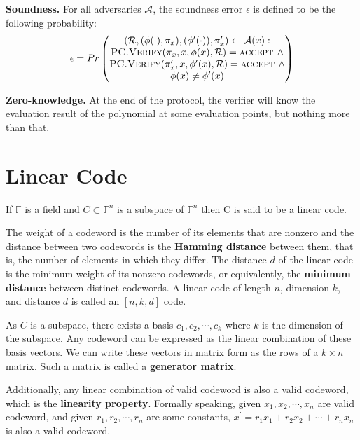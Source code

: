 \textbf{Soundness.} For all adversaries $\mathcal{A}$, the soundness error $\epsilon$ is defined to be the following probability:
$$
\epsilon = Pr
\begin{pmatrix}
 (\mathcal{R}, (\phi(\cdot), \pi_x), (\phi^\prime(\cdot)), \pi_x^\prime) \leftarrow \mathcal{A}(x): \\
 \textsc{PC.Verify}(\pi_x, x, \phi(x), \mathcal{R}) = \textsc{accept } \wedge \\
 \textsc{PC.Verify}(\pi_x^\prime, x, \phi^\prime(x), \mathcal{R}) = \textsc{accept } \wedge \\
 \phi(x) \neq \phi^\prime(x)
\end{pmatrix}
$$

\textbf{Zero-knowledge.} At the end of the protocol, the verifier will know the evaluation result of the polynomial at some evaluation points, but nothing more than that.

\section{Linear Code}

\begin{definition}
If $\mathbb{F}$ is a field and $C \subset \mathbb{F}^n$ is a subspace of $\mathbb{F}^n$ then C is said to be a linear code.
\end{definition}

The weight of a codeword is the number of its elements that are nonzero and the distance between two codewords is the \textbf{Hamming distance} between them, that is, the number of elements in which they differ. The distance $d$ of the linear code is the minimum weight of its nonzero codewords, or equivalently, the \textbf{minimum distance} between distinct codewords. A linear code of length $n$, dimension $k$, and distance $d$ is called an $[n,k,d]$ code.

As $C$ is a subspace, there exists a basis $c_1, c_2, \cdots, c_k$ where $k$ is the dimension of the subspace. Any codeword can be expressed as the linear combination of these basis vectors. We can write these vectors in matrix form as the rows of a $k \times n$ matrix. Such a matrix is called a \textbf{generator matrix}.

Additionally, any linear combination of valid codeword is also a valid codeword, which is the \textbf{linearity property}. Formally speaking, given $x_1, x_2, \cdots, x_n$ are valid codeword, and given $r_1, r_2, \cdots, r_n$ are some constants, $x^\prime = r_1 x_1 + r_2 x_2 + \cdots + r_n x_n$ is also a valid codeword.

